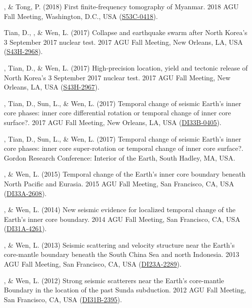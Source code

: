 \begin{etaremune}
\item
    \Yao, \& Tong, P. (2018)
    First finite-frequency tomography of Myanmar.
    2018 AGU Fall Meeting, Washington, D.C., USA (\href{http://adsabs.harvard.edu/abs/2018AGUFM.S53C0418Y}{S53C-0418}).
\item
    Tian, D., \Yao, \& Wen, L. (2017)
    Collapse and earthquake swarm after North Korea's 3 September 2017 nuclear test.
    2017 AGU Fall Meeting, New Orleans, LA, USA (\href{http://adsabs.harvard.edu/abs/2017AGUFM.S43H2968T}{S43H-2968}).
\item
    \Yao, Tian, D., \& Wen, L. (2017)
    High-precision location, yield and tectonic release of North Korea's 3 September 2017 nuclear test.
    2017 AGU Fall Meeting, New Orleans, LA, USA (\href{http://adsabs.harvard.edu/abs/2017AGUFM.S43H2967Y}{S43H-2967}).
\item
    \Yao, Tian, D., Sun, L., \& Wen, L. (2017)
    Temporal change of seismic Earth's inner core phases: inner core differential rotation or temporal change of inner core surface?.
    2017 AGU Fall Meeting, New Orleans, LA, USA (\href{http://adsabs.harvard.edu/abs/2017AGUFMDI33B0405Y}{DI33B-0405}).
\item
    \Yao, Tian, D., Sun, L., \& Wen, L. (2017)
    Temporal change of seismic Earth's inner core phases: inner core super-rotation or temporal change of inner core surface?.
    Gordon Research Conference: Interior of the Earth, South Hadley, MA, USA.
\item
    \Yao, \& Wen, L. (2015)
    Temporal change of the Earth's inner core boundary beneath North Pacific and Eurasia.
    2015 AGU Fall Meeting, San Francisco, CA, USA (\href{http://adsabs.harvard.edu/abs/2015AGUFMDI33A2608Y}{DI33A-2608}).
\item
    \Yao, \& Wen, L. (2014)
    New seismic evidence for localized temporal change of the Earth's inner core boundary.
    2014 AGU Fall Meeting, San Francisco, CA, USA (\href{http://adsabs.harvard.edu/abs/2014AGUFMDI31A4261Y}{DI31A-4261}).
\item
    \Yao, \& Wen, L. (2013)
    Seismic scattering and velocity structure near the Earth's core-mantle boundary beneath the South China Sea and north Indonesia.
    2013 AGU Fall Meeting, San Francisco, CA, USA (\href{http://adsabs.harvard.edu/abs/2013AGUFMDI23A2289Y}{DI23A-2289}).
\item
    \Yao, \& Wen, L. (2012)
    Strong seismic scatterers near the Earth's core-mantle Boundary in the location of the past Sunda subduction.
    2012 AGU Fall Meeting, San Francisco, CA, USA (\href{http://adsabs.harvard.edu/abs/2012AGUFMDI31B2395Y}{DI31B-2395}).
\end{etaremune}
